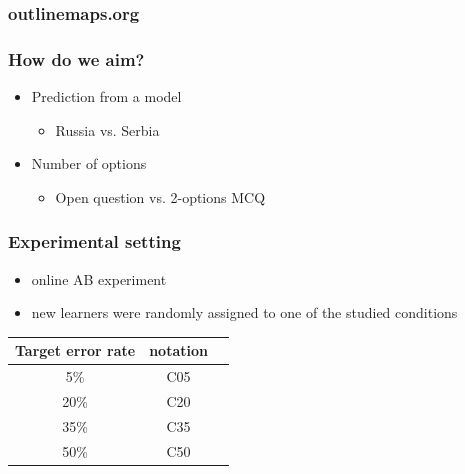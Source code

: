 \documentclass[bigger]{beamer}
\begin{document}
\begin{frame}
  \frametitle{outlinemaps.org}
	\noindent{}
\end{frame}

\begin{frame}
	\frametitle{How do we aim?}
	\begin{itemize}
		\item Prediction from a model
    \begin{itemize}
      \item Russia vs. Serbia
    \end{itemize}
		\item Number of options
    \begin{itemize}
      \item Open question vs. 2-options MCQ
    \end{itemize}
	\end{itemize}
\end{frame}

\begin{frame}
  \frametitle{Experimental setting}
	\begin{itemize}
		\item online AB experiment
		\item new learners were randomly assigned to one of the studied conditions
	\end{itemize}
	\begin{center}
		\begin{tabular}{ccc}
			\textbf{Target error rate} & \textbf{notation} \\
			\toprule
			 5\% & C05 \\
			 20\%   & C20 \\
			 35\% & C35 \\
			 50\%   & C50 \\
			\bottomrule
		\end{tabular}
	\end{center}
\end{frame}
\end{document}
